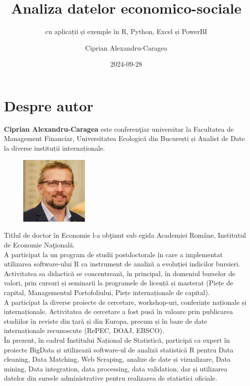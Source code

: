 \documentclass[
  11pt,
  b5paper,
  nottoc]{book}
\title{Analiza datelor economico-sociale}
\subtitle{cu aplicații și exemple în R, Python, Excel și PowerBI}
\author{Ciprian Alexandru-Caragea}
\date{2024-09-28}
\renewcommand{\contentsname}{Cuprins}
\renewcommand*\contentsname{Table of contents}
\newcommand\contentsname{Table of contents}
\begin{document}
\frontmatter
\maketitle

\renewcommand*\contentsname{Cuprins}
{
\setcounter{tocdepth}{1}
\tableofcontents
}
\listoffigures
\listoftables

\mainmatter
{}

\chapter*{Despre autor}\label{despre-autor}


\setcounter{page}{3}

\textbf{Ciprian Alexandru-Caragea} este conferenţiar universitar la
Facultatea de Management Financiar, Universitatea Ecologică din
București și Analist de Date la diverse instituții internaționale.\\

\begin{figure}
  \begin{center}
    \includegraphics[width=0.3\textwidth]{images/Ciprian_DGINS2018.jpg}
  \end{center}
\end{figure}

Titlul de doctor în Economie l-a obţinut sub egida Academiei Române,
Institutul de Economie Naţională.\\
A participat la un program de studii postdoctorale în care a implementat
utilizarea software-ului R ca instrument de analiză a evoluției
indicilor bursieri.\\
Activitatea sa didactică se concentrează, în principal, în domeniul
burselor de valori, prin cursuri și seminarii la programele de licență
și masterat (Piețe de capital, Managementul Portofoliului, Piețe
internaționale de capital).\\
A participat la diverse proiecte de cercetare, workshop-uri, conferințe
naționale și internaționale. Activitatea de cercetare a fost pusă în
valoare prin publicarea studiilor în reviste din țară și din Europa,
precum și în baze de date internaționale recunoscute (RePEC, DOAJ,
EBSCO).\\
În prezent, în cadrul Institului Național de Statistică, participă ca
expert în proiecte BigData și utilizează software-ul de analiză
statistică R pentru Data cleaning, Data Matching, Web Scraping, analize
de date și vizualizare, Data mining, Data integration, data processing,
data validation, dar și utilizarea datelor din sursele administrative
pentru realizarea de statistici oficiale.
\end{document}
